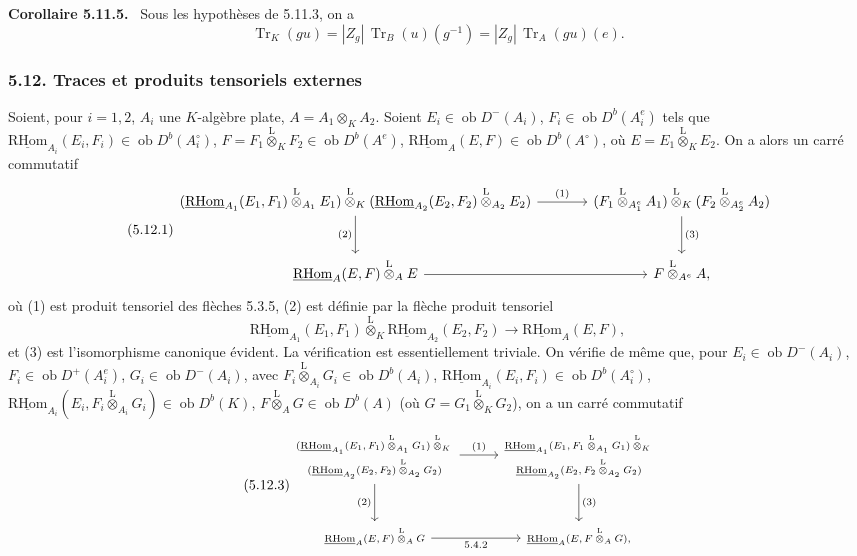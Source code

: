 \documentclass[11pt]{article}
\newenvironment{statement}[1]{\par\medskip\noindent\textbf{#1.}\ }{\par\medskip}
\newcommand{\R}{\mathrm{R}}\newcommand{\RHomCore}{\mathrm{RHom}}
\newcommand{\ob}{\operatorname{ob}}
\providecommand{\RHom}{\RHomCore}
\providecommand{\uRHom}{\underline{\RHom}}
\providecommand{\Tr}{\operatorname{Tr}}
\providecommand{\Tr}{\operatorname{Tr}}
\providecommand{\lten}{\overset{\mathrm L}{\otimes}}
\providecommand{\Tr}{\operatorname{Tr}}
\providecommand{\RHom}{\RHomCore}
\providecommand{\ob}{\operatorname{ob}}
\providecommand{\lten}{\overset{\mathrm L}{\otimes}}
\providecommand{\RHom}{\R\mathcal{H}om}
\providecommand{\lten}{\overset{\mathrm L}{\otimes}}
\providecommand{\R}{\mathrm R}
\providecommand{\Tr}{\operatorname{Tr}}
\providecommand{\lten}{\overset{\mathrm L}{\otimes}}
\providecommand{\lten}{\overset{\mathrm L}{\otimes}}
\providecommand{\lten}{\overset{\mathrm L}{\otimes}}
\providecommand{\RHom}{\RHomCore}
\providecommand{\Tr}{\operatorname{Tr}}
\providecommand{\lten}{\overset{\mathrm L}{\otimes}}
\begin{document}
\begin{statement}{Corollaire 5.11.5}
Sous les hypothèses de 5.11.3, on a
\begin{equation}\tag{5.11.5}
\Tr_K(gu)=|Z_g|\,\Tr_B(u)(g^{-1})=|Z_g|\,\Tr_A(gu)(e).
\end{equation}
\end{statement}

\subsubsection*{5.12. Traces et produits tensoriels externes}

Soient, pour $i=1,2$, $A_i$ une $K$-algèbre plate, $A=A_1\otimes_KA_2$. Soient $E_i\in\ob D^-(A_i)$, $F_i\in\ob D^b(A_i^e)$ tels que $\uRHom_{A_i}(E_i,F_i)\in\ob D^b(A_i^\circ)$, $F=F_1\lten_KF_2\in\ob D^b(A^e)$, $\uRHom_A(E,F)\in\ob D^b(A^\circ)$, où $E=E_1\lten_KE_2$. On a alors un carré commutatif
\begin{equation}\tag{5.12.1}
\begin{tikzcd}[column sep=large,row sep=large]
(\uRHom_{A_1}(E_1,F_1)\lten_{A_1}E_1)\lten_K(\uRHom_{A_2}(E_2,F_2)\lten_{A_2}E_2) \arrow[r,"(1)"] \arrow[d,"(2)"'] & (F_1\lten_{A_1^e}A_1)\lten_K(F_2\lten_{A_2^e}A_2) \arrow[d,"(3)"]\\
\uRHom_A(E,F)\lten_AE \arrow[r] & F\lten_{A^e}A,
\end{tikzcd}
\end{equation}
où (1) est produit tensoriel des flèches 5.3.5, (2) est définie par la flèche produit tensoriel
\begin{equation}\tag{5.12.2}
\uRHom_{A_1}(E_1,F_1)\lten_K\uRHom_{A_2}(E_2,F_2)\longrightarrow\uRHom_A(E,F),
\end{equation}
et (3) est l'isomorphisme canonique évident. La vérification est essentiellement triviale. On vérifie de même que, pour $E_i\in\ob D^-(A_i)$, $F_i\in\ob D^+(A_i^e)$, $G_i\in\ob D^-(A_i)$, avec $F_i\lten_{A_i}G_i\in\ob D^b(A_i)$, $\uRHom_{A_i}(E_i,F_i)\in\ob D^b(A_i^\circ)$, $\uRHom_{A_i}(E_i,F_i\lten_{A_i}G_i)\in\ob D^b(K)$, $F\lten_AG\in\ob D^b(A)$ (où $G=G_1\lten_KG_2$), on a un carré commutatif
\begin{equation}\tag{5.12.3}
\begin{tikzcd}[column sep=2.8em,row sep=large,cells={nodes={font=\scriptsize}},every label/.append style={font=\scriptsize}]
\begin{gathered}
(\uRHom_{A_1}(E_1,F_1)\lten_{A_1}G_1)\lten_K{}\\[-.15em]
(\uRHom_{A_2}(E_2,F_2)\lten_{A_2}G_2)
\end{gathered}
\arrow[r,"(1)"] \arrow[d,"(2)"']
&
\begin{gathered}
\uRHom_{A_1}(E_1,F_1\lten_{A_1}G_1)\lten_K{}\\[-.15em]
\uRHom_{A_2}(E_2,F_2\lten_{A_2}G_2)
\end{gathered}
\arrow[d,"(3)"]\\
\uRHom_A(E,F)\lten_AG \arrow[r,"5.4.2"'] & \uRHom_A(E,F\lten_AG),
\end{tikzcd}
\end{equation}
\end{document}
